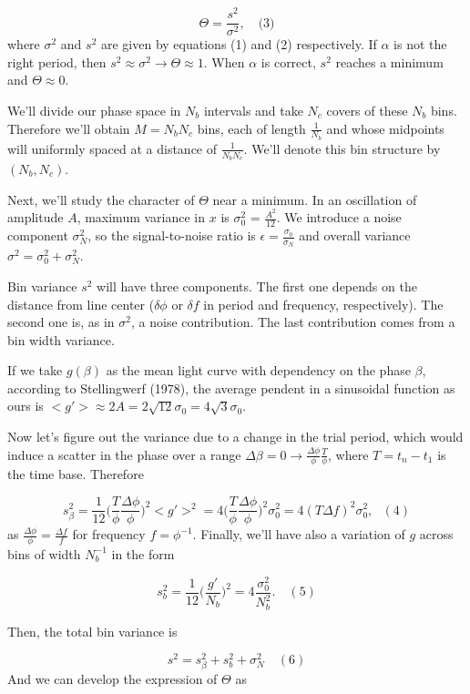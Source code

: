 \documentclass[twocolumn]{revtex4}
\begin{document}
$$
\Theta = \frac{s^2}{\sigma^2}, \quad \text{(3)}
$$
where $\sigma^2$ and $s^2$ are given by equations (1) and (2) respectively. If $\alpha$ is not the right period, then $s^2 \approx \sigma^2 \rightarrow \Theta \approx 1$. When  $\alpha$ is correct, $s^2$ reaches a minimum and $\Theta \approx 0$.

We'll divide our phase space in $N_b$ intervals and take $N_c$ covers of these $N_b$ bins. Therefore we'll obtain $M=N_b N_c$ bins, each of length $\frac{1}{N_b}$ and whose midpoints will uniformly spaced at a distance of $\frac{1}{N_bN_c}$. We'll denote this bin structure by $(N_b, N_c)$.

Next, we'll study the character of $\Theta$ near a minimum. In an oscillation of amplitude $A$, maximum variance in $x$ is $\sigma_0^2$ = $\frac{A^2}{12}$. We introduce a noise component $\sigma_N^2$, so the signal-to-noise ratio is $\epsilon=\frac{\sigma_0}{\sigma_N}$ and overall variance $\sigma^2 = \sigma_0^2 + \sigma_N^2$.

Bin variance $s^2$ will have three components. The first one depends on the distance from line center ($\delta \phi$ or $\delta f$ in period and frequency, respectively). The second one is, as in $\sigma^2$, a noise contribution. The last contribution comes from a bin width variance. 

If we take $g(\beta)$ as the mean light curve with dependency on the phase $\beta$, according to Stellingwerf (1978), the average pendent in a sinusoidal function as ours is $<g'> \approx 2 A = 2 \sqrt{12} \sigma_0 = 4 \sqrt{3} \sigma_0$. 

Now let's figure out the variance due to a change in the trial period, which would induce a scatter in the phase over a range $\Delta \beta = 0 \rightarrow \frac{\Delta \phi}{\phi}\frac{T}{\phi}$, where $T=t_n - t_1$ is the time base. Therefore

{\small
$$
s_\beta^2 = \frac{1}{12}\Bigg( \frac{T}{\phi}\frac{\Delta \phi}{\phi}\Bigg)^2 < g'>^2 = 4 \Bigg(\frac{T}{\phi}\frac{\Delta \phi}{\phi}\Bigg)^2\sigma_0^2=4 (T \Delta f)^2\sigma_0^2, \text{   } (4)
$$
}
as $\frac{\Delta \phi}{\phi} = \frac{\Delta f}{f}$ for frequency $f=\phi^{-1}$.
Finally, we'll have also a variation of $g$ across bins of width $N_b^{-1}$ in the form

$$
s_b^2=\frac{1}{12}\Bigg(\frac{g'}{N_b}\Bigg)^2 = 4\frac{\sigma_0^2}{N_b^2}. \quad (5)
$$

Then, the total bin variance is 

$$
s^2=s_{\beta}^2 + s_b^2 + \sigma_N^2 \quad (6)
$$
And we can develop the expression of $\Theta$ as 
\end{document}
